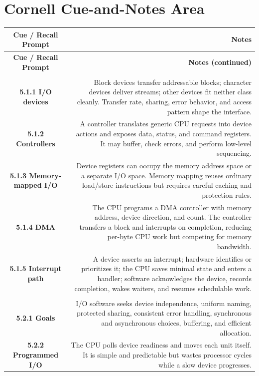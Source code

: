 \documentclass[10pt,letterpaper]{article}
\begin{document}
\section*{Cornell Cue-and-Notes Area}
\small
\begin{longtable}{C N}
\color{white}\textbf{Cue / Recall Prompt} &
\color{white}\textbf{Notes}\\
\endfirsthead
{}
\color{white}\textbf{Cue / Recall Prompt} &
\color{white}\textbf{Notes (continued)}\\
\endhead
{}\\*\hline
\textbf{5.1.1 I/O devices} & Block devices transfer addressable blocks; character devices deliver streams; other devices fit neither class cleanly. Transfer rate, sharing, error behavior, and access pattern shape the interface.\\\hline
\textbf{5.1.2 Controllers} & A controller translates generic CPU requests into device actions and exposes data, status, and command registers. It may buffer, check errors, and perform low-level sequencing.\\\hline
\textbf{5.1.3 Memory-mapped I/O} & Device registers can occupy the memory address space or a separate I/O space. Memory mapping reuses ordinary load/store instructions but requires careful caching and protection rules.\\\hline
\textbf{5.1.4 DMA} & The CPU programs a DMA controller with memory address, device direction, and count. The controller transfers a block and interrupts on completion, reducing per-byte CPU work but competing for memory bandwidth.\\\hline
\textbf{5.1.5 Interrupt path} & A device asserts an interrupt; hardware identifies or prioritizes it; the CPU saves minimal state and enters a handler; software acknowledges the device, records completion, wakes waiters, and resumes schedulable work.\\\hline
{}\\*\hline
\textbf{5.2.1 Goals} & I/O software seeks device independence, uniform naming, protected sharing, consistent error handling, synchronous and asynchronous choices, buffering, and efficient allocation.\\\hline
\textbf{5.2.2 Programmed I/O} & The CPU polls device readiness and moves each unit itself. It is simple and predictable but wastes processor cycles while a slow device progresses.\\\hline

\end{longtable}
\end{document}
